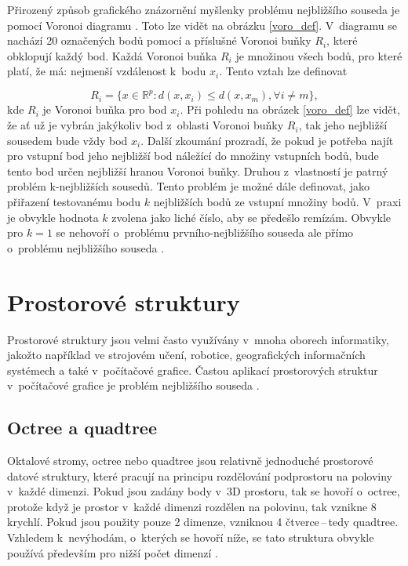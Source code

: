 Přirozený způsob grafického znázornění myšlenky problému nejbližšího souseda je pomocí Voronoi diagramu \cite{octreehash}. Toto lze vidět na obrázku \ref{voro_def}. V~diagramu se nachází 20 označených bodů pomocí \uv{+} a příslušné Voronoi buňky $R_i$, které obklopují každý bod. Každá Voronoi buňka $R_i$ je množinou všech bodů, pro které platí, že má: nejmenší vzdálenost k~bodu $x_i$. Tento vztah lze definovat \cite{knn}

\[
R_i = \{x \in \mathbb{R}^p : d(x, x_i) \leq d(x, x_m), \forall i \neq m\},
\]
kde $R_i$ je Voronoi buňka pro bod $x_i$. Při pohledu na obrázek \ref{voro_def} lze vidět, že ať už je vybrán jakýkoliv bod z~oblasti Voronoi buňky $R_i$, tak jeho nejbližší sousedem bude vždy bod $x_i$. Další zkoumání prozradí, že pokud je potřeba najít pro vstupní bod jeho nejbližší bod náležící do množiny vstupních bodů, bude tento bod určen nejbližší hranou Voronoi buňky. Druhou z~vlastností je patrný problém k-nejbližších sousedů. Tento problém je možné dále definovat, jako přiřazení testovanému bodu $k$ nejbližších bodů ze vstupní množiny bodů. V~praxi je obvykle hodnota $k$ zvolena jako liché číslo, aby se předešlo remízám. Obvykle pro $k = 1$ se nehovoří o~problému prvního-nejbližšího souseda ale přímo o~problému nejbližšího souseda \cite{knn}.

\section{Prostorové struktury}
Prostorové struktury jsou velmi často využívány v~mnoha oborech informatiky, jakožto například ve strojovém učení, robotice, geografických informačních systémech a také v~počítačové grafice. Častou aplikací prostorových struktur v~počítačové grafice je problém nejbližšího souseda \cite{balltree}.






\subsection*{Octree a quadtree}
\label{octree}
Oktalové stromy, octree nebo quadtree jsou relativně jednoduché prostorové datové struktury, které pracují na principu rozdělování podprostoru na poloviny v~každé dimenzi. Pokud jsou zadány body v~3D prostoru, tak se hovoří o~octree, protože když je prostor v~každé dimenzi rozdělen na polovinu, tak vznikne 8 krychlí. Pokud jsou použity pouze 2 dimenze, vzniknou 4 čtverce\,--\,tedy quadtree. Vzhledem k~nevýhodám, o~kterých se hovoří níže, se tato struktura obvykle používá především pro nižší počet dimenzí \cite{octreehash}.

